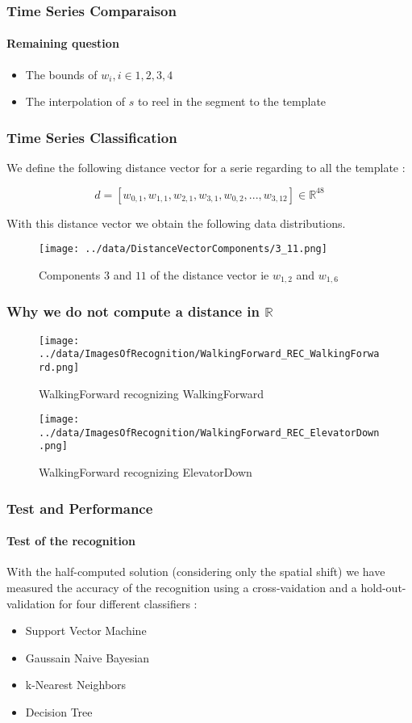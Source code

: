 \documentclass[11pt, sans, handout]{beamer}
\newcommand{\R}{\mathbb{R}}
\begin{document}
\begin{frame}
	\frametitle{Time Series Comparaison}
	\framesubtitle{Remaining question}

	\begin{itemize}
		\item The bounds of $w_i, i \in {1,2,3,4}$
		\item The interpolation of $s$ to reel in the segment to the template
	\end{itemize}		
\end{frame}

\begin{frame}
	\frametitle{Time Series Classification}

	We define the following distance vector for a serie regarding to all the template :
	
	\[ d=[w_{0,1}, w_{1,1}, w_{2,1}, w_{3,1}, w_{0,2}, ..., w_{3,12}] \in \R^{48} \]
	
	With this distance vector we obtain the following data distributions. 
	
	\begin{figure}[H]
		\centering
		\texttt{[image: ../data/DistanceVectorComponents/3\_11.png]}
		\caption{Components $3$ and $11$ of the distance vector ie $w_{1,2}$ and $w_{1,6}$}
		\label{dist_components}
	\end{figure}
	
\end{frame}

\begin{frame}
	\frametitle{Why we do not compute a distance in $\R$}
	
	\begin{figure}
      \texttt{[image: ../data/ImagesOfRecognition/WalkingForward\_REC\_WalkingForward.png]}
      \caption{WalkingForward recognizing WalkingForward}
   	\end{figure} 
   	\begin{figure}
      \texttt{[image: ../data/ImagesOfRecognition/WalkingForward\_REC\_ElevatorDown.png]}
      \caption{WalkingForward recognizing ElevatorDown}
	\end{figure}
	
\end{frame}

\begin{frame}
	\frametitle{Test and Performance}
	\framesubtitle{Test of the recognition}
	
	With the half-computed solution (considering only the spatial shift) we have measured the accuracy of the recognition using a cross-vaidation and a hold-out-validation for four different classifiers :
	
	\begin{itemize}
		\item Support Vector Machine
		\item Gaussain Naive Bayesian
		\item k-Nearest Neighbors
		\item Decision Tree
	\end{itemize}
		
\end{frame}
\end{document}
